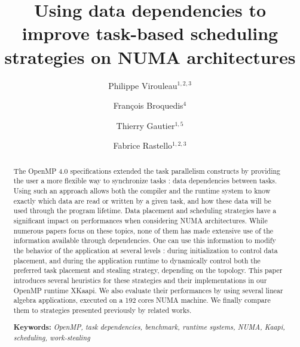 \documentclass{Styles/llncs}
\begin{document}
\title{Using data dependencies to improve task-based scheduling strategies on NUMA architectures}
\author{
  Philippe Virouleau$^{1,2,3}$ \and François Broquedis$^4$ \and Thierry Gautier$^{1,5}$ \and Fabrice Rastello$^{1,2,3}$
 \vspace*{-1ex}}
\date{}
\maketitle

\begin{abstract}
  \vspace*{-5ex} The OpenMP 4.0 specifications extended the task parallelism
  constructs by providing the user a more flexible way to synchronize tasks :
  data dependencies between tasks.
  Using such an approach allows both the compiler and the runtime system
  to know exactly which data are read or written by a given task, and how these
  data will be used through the program lifetime.  Data placement and scheduling
  strategies have a significant impact on performances when considering
  NUMA architectures.  While numerous papers focus on these topics, none of them
  has made extensive use of the information available through dependencies.
  One can use this information to modify the behavior of the application at
  several levels : during initialization to control data placement,
  and during the application runtime to dynamically control both the preferred
  task placement and stealing strategy, depending on the topology.
  This paper introduces several heuristics for these strategies and their
  implementations in our OpenMP runtime XKaapi.
  We also evaluate their performances by using several linear algebra
  applications, executed on a 192 cores NUMA machine. We finally
  compare them to strategies presented previously by related works.

\smallskip
  \noindent\textbf{Keywords:}
  \emph{
    OpenMP, task dependencies, benchmark, runtime systems, NUMA, Kaapi, scheduling, work-stealing
  }
\end{abstract}
\end{document}
